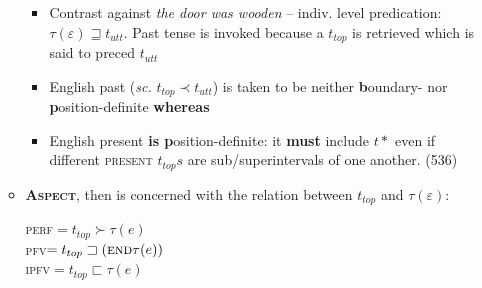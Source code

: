 \documentclass[10pt]{article}
\begin{document}
\begin{itemize}
\begin{itemize}
\begin{itemize}
	\item Contrast against \textit{the door was wooden} -- indiv. level predication: $ \tau(\varepsilon) \sqsupseteq t_{utt}$. Past tense is invoked because a $ t_{top} $ is retrieved which is said to preced $ t_{utt} $
	\item English past (\textit{sc.} $ t_{top}\prec t_{utt} $) is taken to be neither \textbf{b}oundary- nor \textbf{p}osition-definite \textbf{whereas}
	\item English present \textbf{is p}osition-definite: it \textbf{must} include $ t* $ even if different \textsc{present} $ t_{top}s $ are sub/superintervals of one another. (536)
\end{itemize}
\item \textsc{\textbf{Aspect}}, then is concerned with the relation between $ t_{top} $ and $ \tau(\varepsilon) $:

\textsc{perf}$=t_{top}\succ\tau(e)$\\
\textsc{pfv}$= t_{top}\sqsupset(\textsc{end}\tau(e)) $\\
\textsc{ipfv}$= t_{top}\sqsubset\tau(e) $
\end{itemize}
\end{itemize}
\end{document}
